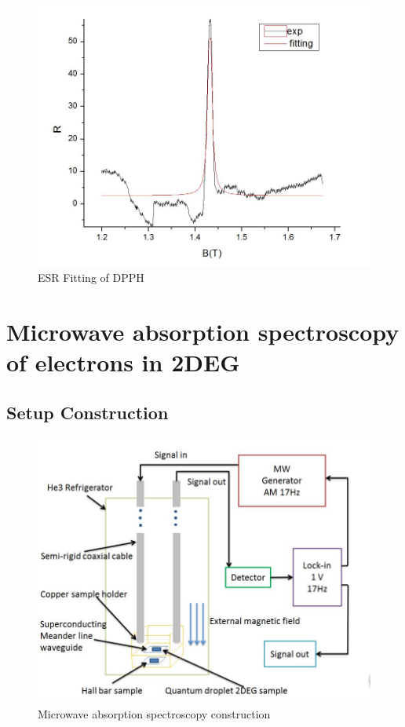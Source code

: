 \documentclass[12pt]{ruthesis}
\begin{document}
 
\begin{figure}
  \centering
  \includegraphics[totalheight=8cm]{figures/dpph_fitting.JPG}
  \caption{ESR Fitting of DPPH}
  \label{dpph_fitting}
\end{figure}
 









\chapter{Microwave absorption spectroscopy of electrons in 2DEG}\label{Absorption}




\section{Setup Construction}\label{Construction}

\begin{figure}
  \centering
  \includegraphics[totalheight=8cm]{figures/configuration.JPG}
  \caption{Microwave absorption spectroscopy construction}
  \label{configuration}
\end{figure}
 
\end{document}
